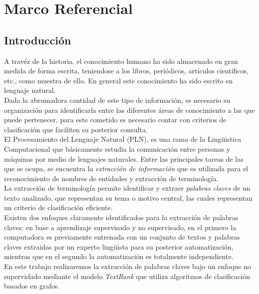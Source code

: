 \chapter{Marco Referencial}
\section{Introducci\'on}
A trav\'ez de la historia, el conocimiento humano ha sido almacenado en gran medida
de forma escrita, teniendose a los libros, peri\'odicos, art\'iculos cient\'ificos,
etc., como muestra de ello. En general este conocimiento ha sido escrito en lenguaje
natural. \\

Dada la abrumadora cantidad de este tipo de informaci\'on, es necesario su 
organizaci\'on para identificarla entre las diferentes \'areas de conocimiento 
a las que puede pertenecer, para este cometido es necesario contar con criterios 
de clasificaci\'on que faciliten su posterior consulta. \\

El Procesamiento del Lenguaje Natural (PLN), es una rama de la Ling\"uistica 
Computacional que b\'asicamente estudia la comunicaci\'on entre personas y 
m\'aquinas por medio de lenguajes naturales. Entre las principales tareas de las que 
se ocupa, se encuentra la \emph{extracci\'on de informaci\'on} que es utilizada 
para el reconocimiento de nombres de entidades y extracci\'on de terminolog\'ia. \\

La extracci\'on de terminolog\'ia permite identificar y extraer \emph{palabras claves} 
de un texto analizado, que representan su tema o motivo central, las cuales 
representan un criterio de clasificaci\'on eficiente.\\

Existen dos enfoques claramente identificados para la extracci\'on de palabras claves:
en base a aprendizaje supervisado y no supervisado, en el primero la computadora es
previamente entrenada con un conjunto de textos y palabras claves extraidas por
un experto ling\"uista para su posterior automatizaci\'on, mientras que en el segundo
la automatizaci\'on es totalmente independiente.\\

En este trabajo realizaremos la extracci\'on de palabras claves bajo un enfoque no
supervidado mediante el modelo \emph{TextRank} que utiliza algoritmos de 
clasificaci\'on basados en grafos.\\

